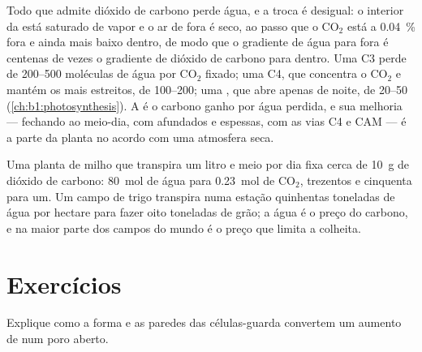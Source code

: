 \begin{proposition}\label{prop:b1:plant-transport:wue}
Todo  que admite dióxido de carbono perde água, e a troca é
desigual: o interior da  está saturado de vapor e o ar de fora é
seco, ao passo que o $\mathrm{CO_2}$ está a \qty{0.04}{\%} fora e
ainda mais baixo dentro, de modo que o gradiente de água para fora é
centenas de vezes o gradiente de dióxido de carbono para dentro. Uma
 C3 perde de \qtyrange{200}{500}{} moléculas de água por
$\mathrm{CO_2}$ fixado; uma  C4, que concentra o $\mathrm{CO_2}$
e mantém os  mais estreitos, de \qtyrange{100}{200}{}; uma
, que abre apenas de noite, de \qtyrange{20}{50}{}
(\cref{ch:b1:photosynthesis}). A \emph{} é o
carbono ganho por água perdida, e sua melhoria --- fechando ao
meio-dia, com  afundados e  espessas, com as vias C4
e CAM --- é a parte da planta no acordo com uma atmosfera seca.
\end{proposition}

\begin{example}\label{ex:b1:plant-transport:bargain}
Uma planta de milho que transpira um litro e meio por dia fixa cerca
de \qty{10}{g} de dióxido de carbono: \qty{80}{mol} de água para
\qty{0.23}{mol} de $\mathrm{CO_2}$, trezentos e cinquenta para um. Um
campo de trigo transpira numa estação quinhentas toneladas de água por
hectare para fazer oito toneladas de grão; a água é o preço do
carbono, e na maior parte dos campos do mundo é o preço que limita a
colheita.
\end{example}

\section{Exercícios}

\begin{exercise}[$\star$]\label{exo:b1:plant-transport:1}
Explique como a forma e as paredes das células-guarda convertem um
aumento de  num poro aberto.
\end{exercise}


